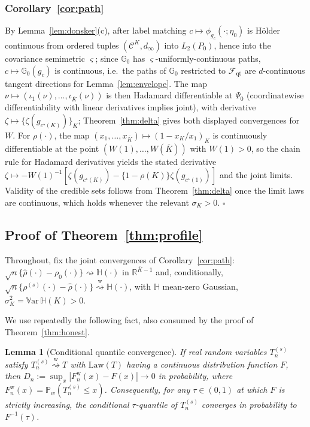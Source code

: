 \documentclass[11pt]{article}
\newtheorem{lemma}{Lemma}
\newcommand{\Pp}{\mathbb P}
\newcommand{\R}{\mathbb R}
\newcommand{\G}{\mathbb G}
\newcommand{\Var}{\mathbb V\mathrm{ar}}
\newcommand{\dto}{\rightsquigarrow}
\newcommand{\dtow}{\overset{\mathrm w}{\rightsquigarrow}}
\newcommand{\Law}{\mathrm{Law}}
\newcommand{\calC}{\mathcal C}
\newcommand{\calF}{\mathcal F}
\begin{document}
\subsubsection{Corollary~\ref{cor:path}}
By Lemma~\ref{lem:donsker}(c), after label matching $c\mapsto\phi_{g_c}(\cdot;\eta_0)$ is H\"older continuous from ordered tuples $(\calC^K,d_\infty)$ into $L_2(P_0)$, hence into the covariance semimetric $\varsigma$; since $\G_0$ has $\varsigma$-uniformly-continuous paths, $c\mapsto\G_0(g_c)$ is continuous, i.e.\ the paths of $\G_0$ restricted to $\calF_{\mathrm{qt}}$ are $d$-continuous tangent directions for Lemma~\ref{lem:envelope}. The map $\nu\mapsto(\iota_1(\nu),\dots,\iota_{\overline K}(\nu))$ is then Hadamard differentiable at $\Psi_0$ (coordinatewise differentiability with linear derivatives implies joint), with derivative $\zeta\mapsto\{\zeta(g_{c^\star(K)})\}_K$; Theorem~\ref{thm:delta} gives both displayed convergences for $W$. For $\rho(\cdot)$, the map $(x_1,\dots,x_{\overline K})\mapsto(1-x_K/x_1)_K$ is continuously differentiable at the point $(W(1),\dots,W(\overline K))$ with $W(1)>0$, so the chain rule for Hadamard derivatives \citep[Lemma~3.9.3]{vdvwellner1996} yields the stated derivative
$\zeta\mapsto-W(1)^{-1}[\zeta(g_{c^\star(K)})-\{1-\rho(K)\}\zeta(g_{c^\star(1)})]$
and the joint limits. Validity of the credible sets follows from Theorem~\ref{thm:delta} once the limit laws are continuous, which holds whenever the relevant $\sigma_K>0$. \hfill$\square$

\subsection{Proof of Theorem~\ref{thm:profile}}\label{app:profile}

Throughout, fix the joint convergences of Corollary~\ref{cor:path}:
$\sqrt n\{\hat\rho(\cdot)-\rho_0(\cdot)\}\dto\mathbb H(\cdot)$ in $\R^{\overline K-1}$ and, conditionally,
$\sqrt n\{\rho^{(s)}(\cdot)-\hat\rho(\cdot)\}\dtow\mathbb H(\cdot)$, with $\mathbb H$ mean-zero Gaussian, $\sigma_K^2=\Var\,\mathbb H(K)>0$.

We use repeatedly the following fact, also consumed by the proof of Theorem~\ref{thm:honest}.

\begin{lemma}[Conditional quantile convergence]\label{lem:condquant}
If real random variables $T_n^{(s)}$ satisfy $T_n^{(s)}\dtow T$ with $\Law(T)$ having a continuous distribution function $F$, then $D_n:=\sup_x|F_n^{\mathrm w}(x)-F(x)|\to0$ in probability, where $F_n^{\mathrm w}(x)=\Pp_w(T_n^{(s)}\le x)$. Consequently, for any $\tau\in(0,1)$ at which $F$ is strictly increasing, the conditional $\tau$-quantile of $T_n^{(s)}$ converges in probability to $F^{-1}(\tau)$.
\end{lemma}
\end{document}
